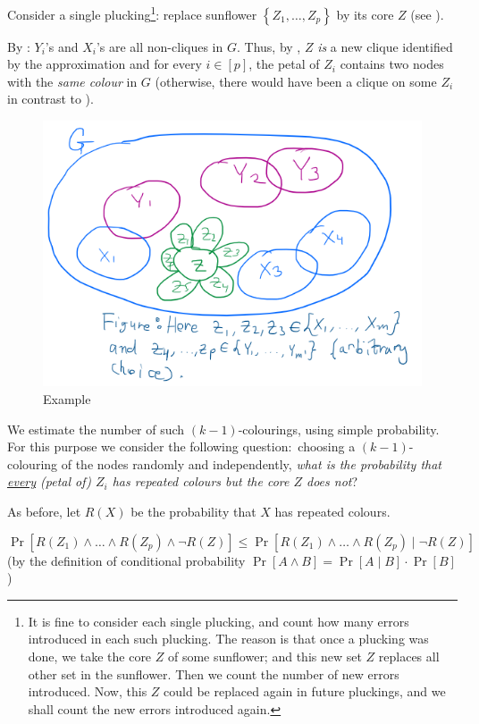 Consider a single plucking\footnote{It is fine to consider each single plucking, and count how many errors introduced in each such plucking. The reason is that once a plucking was done, we take the core $Z$ of some sunflower; and this new set $Z$ replaces all other set in the sunflower. Then we count the number of new errors introduced. Now, this $Z$ could  be replaced again in future pluckings, and we shall count the new errors introduced again.}: 
replace sunflower $\left\{Z_1, \ldots, Z_p\right\}$ by its core $Z$ (see ).

By : $Y_i$'s and $X_i$'s are all non-cliques in $G$.
Thus, by , $Z$ \emph{is} a new  clique
identified by the approximation and for every $i\in[p]$, the petal of $Z_i$ contains two nodes with the \emph{same colour} in $G$ (otherwise, there would have been a clique on some $Z_i$ in contrast to ).

\begin{figure}[H]
    \centering
    \includegraphics[width=.6\linewidth]{images/clique3.png}
    \caption{Example}
    \label{fig:pluck-stage}
\end{figure}


We estimate the number of such $(k-1)$-colourings, using simple probability.
For this purpose we consider the following question:\ choosing a $(k-1)$-colouring of the nodes randomly and independently, \emph{what is the probability that \uline{every} (petal of) $Z_i$ has repeated colours but the core $Z$ does not}?

As before, let $R(X)$ be the probability that $X$ has repeated colours.


$$
\operatorname{Pr}
\left[R\left(Z_1\right) \wedge 
\ldots \wedge R\left(Z_p\right) \wedge \neg R(Z)
\right] 
\leq \operatorname{Pr}\left[R\left(Z_1\right) \wedge \ldots \wedge R\left(Z_p\right) \mid \neg R(Z)\right]$$
(by the definition of conditional probability $\operatorname{Pr}[A \land B]=\operatorname{Pr}[A \mid B] \cdot \operatorname{Pr}[B]$)

